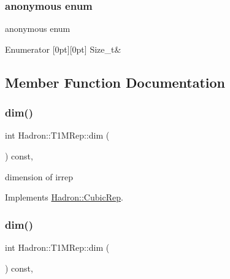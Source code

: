 \subsubsection{\texorpdfstring{anonymous enum}{anonymous enum}}
{\footnotesize\ttfamily anonymous enum}

\begin{DoxyEnumFields}{Enumerator}
[0pt][0pt]{}\mbox{\label{structHadron_1_1T1MRep_a6e798ea02cc3ffd5502525d251d152c8a58d6b01db078a0bdeff5761be3766496}} 
Size\+\_\+t&\\
\hline

\end{DoxyEnumFields}


\subsection{Member Function Documentation}
\mbox{\label{structHadron_1_1T1MRep_ad69f46dceb9157a51d1b682b107e5dff}} 
\subsubsection{\texorpdfstring{dim()}{dim()}\hspace{0.1cm}{\footnotesize\ttfamily [1/2]}}
{\footnotesize\ttfamily int Hadron\+::\+T1\+M\+Rep\+::dim (\begin{DoxyParamCaption}{ }\end{DoxyParamCaption}) const\hspace{0.3cm}{\ttfamily [inline]}, {\ttfamily [virtual]}}

dimension of irrep 

Implements \mbox{\hyperlink{structHadron_1_1CubicRep_ac178d14064f037a66af4b9fb4b312d51}{Hadron\+::\+Cubic\+Rep}}.

\mbox{\label{structHadron_1_1T1MRep_ad69f46dceb9157a51d1b682b107e5dff}} 
\subsubsection{\texorpdfstring{dim()}{dim()}\hspace{0.1cm}{\footnotesize\ttfamily [2/2]}}
{\footnotesize\ttfamily int Hadron\+::\+T1\+M\+Rep\+::dim (\begin{DoxyParamCaption}{ }\end{DoxyParamCaption}) const\hspace{0.3cm}{\ttfamily [inline]}, {\ttfamily [virtual]}}

